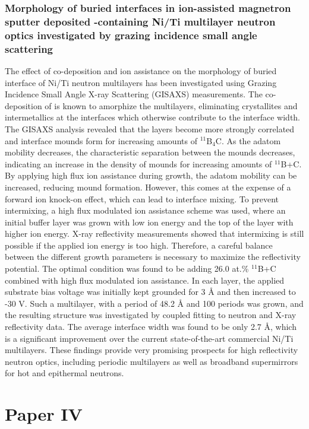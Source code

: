 \subsubsection*{Morphology of buried interfaces in ion-assisted magnetron sputter deposited \BC-containing Ni/Ti multilayer neutron optics investigated by grazing incidence small angle scattering}
The effect of \BC co-deposition and ion assistance on the morphology of buried interface of Ni/Ti neutron multilayers has been investigated using Grazing Incidence Small Angle X-ray Scattering (GISAXS) measurements. The co-deposition of \BC is known to amorphize the multilayers, eliminating crystallites and intermetallics at the interfaces which otherwise contribute to the interface width. The GISAXS analysis revealed that the layers become more strongly correlated and interface mounds form for increasing amounts of $^{\textrm{11}}$B$_\textrm{4}$C. As the adatom mobility decreases, the characteristic separation between the mounds decreases, indicating an increase in the density of mounds for increasing amounts of $^{\textrm{11}}$B+C.
By applying high flux ion assistance during growth, the adatom mobility can be increased, reducing mound formation. However, this comes at the expense of a forward ion knock-on effect, which can lead to interface mixing. To prevent intermixing, a high flux modulated ion assistance scheme was used, where an initial buffer layer was grown with low ion energy and the top of the layer with higher ion energy. X-ray reflectivity measurements showed that intermixing is still possible if the applied ion energy is too high. Therefore, a careful balance between the different growth parameters is necessary to maximize the reflectivity potential.
The optimal condition was found to be adding 26.0 at.\% $^{11}$B+C combined with high flux modulated ion assistance. In each layer, the applied substrate bias voltage was initially kept grounded for 3 Å and then increased to -30 V. Such a multilayer, with a period of 48.2 Å and 100 periods was grown, and the resulting structure was investigated by coupled fitting to neutron and X-ray reflectivity data. The average interface width was found to be only 2.7 Å, which is a significant improvement over the current state-of-the-art commercial Ni/Ti multilayers. These findings provide very promising prospects for high reflectivity neutron optics, including periodic multilayers as well as broadband supermirrors for hot and epithermal neutrons.

\section{Paper IV}
